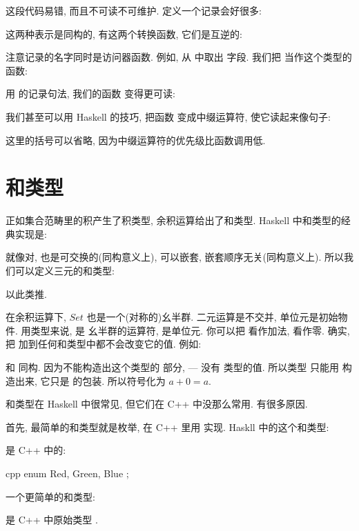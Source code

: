 这段代码易错, 而且不可读不可维护. 定义一个记录会好很多:

这两种表示是同构的, 有这两个转换函数, 它们是互逆的:


注意记录的名字同时是访问器函数. 例如,  从  中取出  字段.
我们把  当作这个类型的函数:

用  的记录句法, 我们的函数  变得更可读:

我们甚至可以用 Haskell 的技巧, 把函数  变成中缀运算符, 使它读起来像句子:

这里的括号可以省略, 因为中缀运算符的优先级比函数调用低.

\section{和类型}

正如集合范畴里的积产生了积类型, 余积运算给出了和类型. Haskell 中和类型的经典实现是:

就像对,  也是可交换的(同构意义上), 可以嵌套, 嵌套顺序无关(同构意义上).
所以我们可以定义三元的和类型:

以此类推.

在余积运算下, $Set$ 也是一个(对称的)幺半群. 二元运算是不交并, 单位元是初始物件. 用类型来说,  是
幺半群的运算符,  是单位元. 你可以把  看作加法,  看作零. 确实, 把 
加到任何和类型中都不会改变它的值. 例如:

和  同构. 因为不能构造出这个类型的  部分,  --- 没有  类型的值. 所以类型
 只能用  构造出来, 它只是  的包装. 所以符号化为 $a + 0 = a$.

和类型在 Haskell 中很常见, 但它们在 C++ 中没那么常用. 有很多原因.

首先, 最简单的和类型就是枚举, 在 C++ 里用  实现. Haskll 中的这个和类型:

是 C++ 中的:

\begin{snip}{cpp}
enum { Red, Green, Blue };
\end{snip}
一个更简单的和类型:

是 C++ 中原始类型 .

